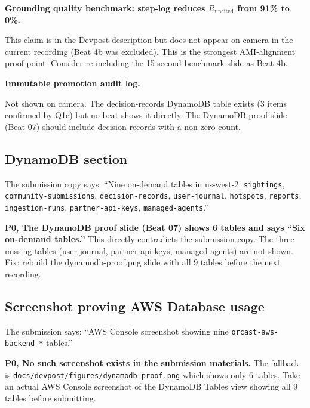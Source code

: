 \textbf{Grounding quality benchmark: step-log reduces $R_\text{uncited}$ from 91\% to 0\%.}
\begin{notebox}
\Pp{} This claim is in the Devpost description but does not appear on camera in the current recording (Beat 4b was excluded). This is the strongest AMI-alignment proof point. Consider re-including the 15-second benchmark slide as Beat 4b.
\end{notebox}

\textbf{Immutable promotion audit log.}
\begin{notebox}
\Ppp{} Not shown on camera. The decision-records DynamoDB table exists (3 items confirmed by Q1c) but no beat shows it directly. The DynamoDB proof slide (Beat 07) should include decision-records with a non-zero count.
\end{notebox}

\subsection{DynamoDB section}

\begin{notebox}
The submission copy says: ``Nine on-demand tables in us-west-2: \texttt{sightings}, \texttt{community-submissions}, \texttt{decision-records}, \texttt{user-journal}, \texttt{hotspots}, \texttt{reports}, \texttt{ingestion-runs}, \texttt{partner-api-keys}, \texttt{managed-agents}.''
\end{notebox}

\begin{p0box}
\textbf{P0, The DynamoDB proof slide (Beat 07) shows 6 tables and says ``Six on-demand tables.''} This directly contradicts the submission copy. The three missing tables (user-journal, partner-api-keys, managed-agents) are not shown. Fix: rebuild the dynamodb-proof.png slide with all 9 tables before the next recording.
\end{p0box}

\subsection{Screenshot proving AWS Database usage}

\begin{notebox}
The submission says: ``AWS Console screenshot showing nine \texttt{orcast-aws-backend-*} tables.''
\end{notebox}

\begin{p0box}
\textbf{P0, No such screenshot exists in the submission materials.} The fallback is \texttt{docs/devpost/figures/dynamodb-proof.png} which shows only 6 tables. Take an actual AWS Console screenshot of the DynamoDB Tables view showing all 9 tables before submitting.
\end{p0box}

